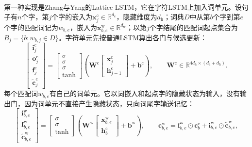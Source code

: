 第一种实现是Zhang与Yang的Lattice-LSTM，它在字符LSTM上加入词单元。设句子有$n$个字，第$j$个字的嵌入为$\bm x^{\mathrm c}_j\in\mathbb R^{d_{\mathrm c}}$，隐藏维度为$d_{\mathrm h}$；词典$D$中从第$b$个字到第$e$个字的匹配词记为$w_{b,e}$，嵌入为$\bm x^{\mathrm w}_{b,e}\in\mathbb R^{d_{\mathrm w}}$；以第$j$个字结尾的匹配词起点集合为$B_j=\{b:w_{b,j}\in D\}$。字符单元先按普通LSTM算出各门与候选更新：
\begin{equation}
  \begin{bmatrix}\bm i^{\mathrm c}_j\\ \bm o^{\mathrm c}_j\\ \bm f^{\mathrm c}_j\\ \tilde{\bm c}^{\mathrm c}_j\end{bmatrix}
  =\begin{bmatrix}\sigma\\ \sigma\\ \sigma\\ \tanh\end{bmatrix}
  \left(\bm W^{\mathrm c}\begin{bmatrix}\bm x^{\mathrm c}_j\\ \bm h^{\mathrm c}_{j-1}\end{bmatrix}+\bm b^{\mathrm c}\right),
  \qquad \bm W^{\mathrm c}\in\mathbb R^{4d_{\mathrm h}\times(d_{\mathrm c}+d_{\mathrm h})}.
  \label{eq:nlp-extraction-lattice-char}
\end{equation}
每个匹配词$w_{b,e}$有自己的词单元。它以词嵌入和起点字的隐藏状态为输入，没有输出门，因为词单元不直接产生隐藏状态，只向词尾字输送记忆：
\begin{equation}
  \begin{bmatrix}\bm i^{\mathrm w}_{b,e}\\ \bm f^{\mathrm w}_{b,e}\\ \tilde{\bm c}^{\mathrm w}_{b,e}\end{bmatrix}
  =\begin{bmatrix}\sigma\\ \sigma\\ \tanh\end{bmatrix}
  \left(\bm W^{\mathrm w}\begin{bmatrix}\bm x^{\mathrm w}_{b,e}\\ \bm h^{\mathrm c}_{b}\end{bmatrix}+\bm b^{\mathrm w}\right),
  \qquad
  \bm c^{\mathrm w}_{b,e}=\bm f^{\mathrm w}_{b,e}\odot\bm c^{\mathrm c}_{b}+\bm i^{\mathrm w}_{b,e}\odot\tilde{\bm c}^{\mathrm w}_{b,e},
  \label{eq:nlp-extraction-lattice-word}
\end{equation}
